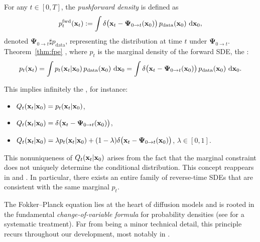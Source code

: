 For any $t\in[0,T]$, the \emph{pushforward density} is defined as
\[
p_t^{\mathrm{fwd}}({\mathbf{x}}_t) := \int \delta\bigl({\mathbf{x}}_t - {\bm{\Psi}}_{0 \to t}({\mathbf{x}}_0)\bigr)\, p_{\mathrm{data}}({\mathbf{x}}_0) \,\mathop{}\!\mathrm{d} {\mathbf{x}}_0,
\]
denoted $\bm{\Psi}_{0\to t} \sharp p_{\mathrm{data}}$, representing the distribution at time $t$ under $\bm{\Psi}_{0\to t}$. Theorem~\ref{thm:fpe} , where $p_t$ is the marginal density of the forward SDE,  the :
\[
p_t({\mathbf{x}}_t) = \int p_t({\mathbf{x}}_t |{\mathbf{x}}_0)\, p_{\mathrm{data}}({\mathbf{x}}_0)\,\mathop{}\!\mathrm{d} {\mathbf{x}}_0
= \int \delta\bigl({\mathbf{x}}_t - \bm{\Psi}_{0\to t}({\mathbf{x}}_0)\bigr)\, p_{\mathrm{data}}({\mathbf{x}}_0)\,\mathop{}\!\mathrm{d} {\mathbf{x}}_0.
\]

This implies infinitely  the , for instance:
\begin{itemize}
  \item {} $Q_t({\mathbf{x}}_t |{\mathbf{x}}_0) = p_t({\mathbf{x}}_t |{\mathbf{x}}_0)$,
  \item {} $Q_t({\mathbf{x}}_t |{\mathbf{x}}_0) = \delta\bigl({\mathbf{x}}_t - \bm{\Psi}_{0\to t}({\mathbf{x}}_0)\bigr)$,
  \item {} $Q_t({\mathbf{x}}_t |{\mathbf{x}}_0) = \lambda p_t({\mathbf{x}}_t |{\mathbf{x}}_0) + (1-\lambda)\delta\bigl({\mathbf{x}}_t - \bm{\Psi}_{0\to t}({\mathbf{x}}_0)\bigr)$, $\lambda\in[0,1]$.
\end{itemize}
This nonuniqueness of $Q_t({\mathbf{x}}_t |{\mathbf{x}}_0)$ arises from the fact that the marginal constraint does not uniquely determine the conditional distribution. This concept reappears in  and . In particular, there exists an entire family of reverse-time SDEs that are consistent with the same marginal $p_t$.

The Fokker–Planck equation lies at the heart of diffusion models and is rooted in the fundamental \emph{change-of-variable formula} for probability densities (see  for a systematic treatment). Far from being a minor technical detail, this principle recurs throughout our development, most notably in .



